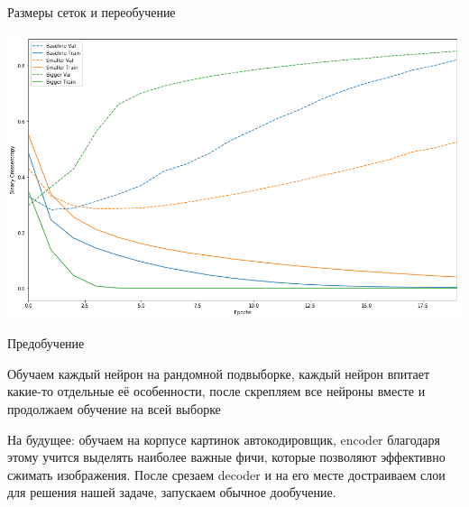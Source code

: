\documentclass[notes,12pt, aspectratio=169]{beamer}
\newenvironment{wideitemize}{\itemize\addtolength{\itemsep}{10pt}}{\enditemize}
\begin{document}

\begin{frame}{Размеры сеток и переобучение}
\begin{center}
\includegraphics[width=0.7\paperwidth]{big_base_small_fit.png}
\end{center}
\end{frame}


\begin{frame}{Предобучение}
\begin{wideitemize}
	\item  Обучаем каждый нейрон на рандомной подвыборке, каждый нейрон впитает какие-то отдельные её особенности, после скрепляем все нейроны вместе и продолжаем обучение на всей выборке
	
	\item  \alert{На будущее:} обучаем на корпусе картинок автокодировщик, encoder благодаря этому учится выделять наиболее важные фичи, которые позволяют эффективно сжимать изображения. После срезаем decoder и на его месте достраиваем слои для решения нашей задаче, запускаем обычное дообучение.
\end{wideitemize}
\end{frame}
\end{document}
